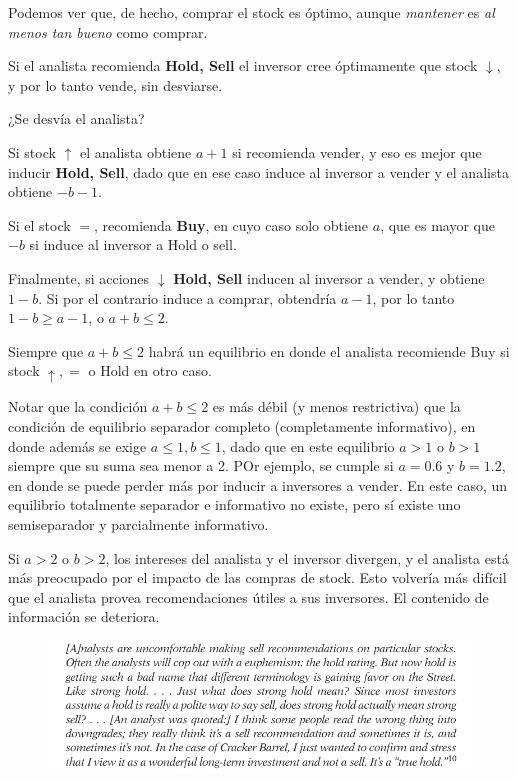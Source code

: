 \documentclass[12pt]{article}
\begin{document}
Podemos ver que, de hecho, comprar el stock es óptimo, aunque \textit{mantener} es \textit{al menos tan bueno} como comprar. 

Si el analista recomienda \textbf{Hold, Sell} el inversor cree óptimamente que stock $ \downarrow  $, y por lo tanto vende, sin desviarse. 

¿Se desvía el analista?

Si stock $ \uparrow $ el analista obtiene $ a+1 $ si recomienda vender, y eso es mejor que inducir \textbf{Hold, Sell}, dado que en ese caso induce al inversor a vender y el analista obtiene $ -b-1 $.

Si el stock $ = $, recomienda \textbf{Buy}, en cuyo caso solo obtiene $ a $, que es mayor que $ -b $ si induce al inversor a Hold o sell.

Finalmente, si acciones $ \downarrow $ \textbf{Hold, Sell} inducen al inversor a vender, y obtiene $ 1-b $. Si por el contrario induce a comprar, obtendría $ a-1 $, por lo tanto $ 1-b \geq a-1$, o $ a+b\leq 2 $.

Siempre que $ a+b\leq 2 $ habrá un equilibrio en donde el analista recomiende Buy si stock $ \uparrow, = $ o Hold en otro caso. 

Notar que la condición $ a+b\leq 2 $ es más débil (y menos restrictiva) que la condición de equilibrio separador completo (completamente informativo), en donde además se exige $ a\leq 1, b\leq 1 $, dado que en este equilibrio $ a>1 $ o $ b>1 $ siempre que su suma sea menor a 2. POr ejemplo, se cumple si $ a=0.6 $ y $ b=1.2 $, en donde se puede perder más por inducir a inversores a vender. En este caso, un equilibrio totalmente separador e informativo no existe, pero sí existe uno semiseparador y parcialmente informativo. 

Si $ a>2 $ o $ b>2 $, los intereses del analista y el inversor divergen, y el analista está más preocupado por el impacto de las compras de stock. Esto volvería más difícil que el analista provea recomendaciones útiles a sus inversores. El contenido de información se deteriora.

\begin{figure}[H]
	\centering
	\includegraphics[width=\textwidth]{analysts.png}
\end{figure}
\end{document}
